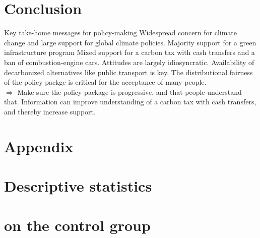 \begin{framefont}{\small}
\section{Conclusion}

\begin{frame}{Key take-home messages for policy-making}
\bbvs
\ip Widespread concern for climate change and large support for global climate policies.
\ip Majority support for a green infrastructure program
\ip Mixed support for a carbon tax with cash transfers and a ban of combustion-engine cars. %
\ip Attitudes are largely idiosyncratic.
\ip Availability of decarbonized alternatives like public transport is key. 
\ip The distributional fairness of the policy packge is critical for the acceptance of many people. \\ $\Rightarrow$ Make sure the policy package is progressive, and that people understand that.
\ip Information can improve understanding of a carbon tax with cash transfers, and thereby increase support.
\ee
\end{frame}

\appendix
\section{Appendix}

\section{Descriptive statistics \\ \quad \\ on the control group}





\end{framefont}
